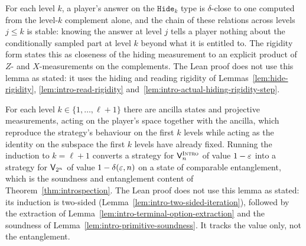 \effortHard

\begin{lemma}
\label{lem:intro-hiding-test}
For each level $k$, a player's answer on the $\mathtt{Hide}_k$ type is $\delta$-close to one
computed from the level-$k$ complement alone, and the chain of these relations across levels
$j \leq k$ is stable: knowing the answer at level $j$ tells a player nothing about the
conditionally sampled part at level $k$ beyond what it is entitled to. The rigidity form
states this as closeness of the hiding measurement to an explicit product of $Z$- and
$X$-measurements on the complements.
The Lean proof does not use this lemma as stated: it uses the hiding and reading rigidity of
Lemmas~\ref{lem:hide-rigidity}, \ref{lem:intro-read-rigidity}
and~\ref{lem:intro-actual-hiding-rigidity-step}.
\end{lemma}

\effortHard

\begin{lemma}
\label{lem:intro-induction}
For each level $k \in \{1, \ldots, \ell + 1\}$ there are ancilla states and projective
measurements, acting on the player's space together with the ancilla, which reproduce the
strategy's behaviour on the first $k$ levels while acting as the identity on the subspace the
first $k$ levels have already fixed. Running the induction to $k = \ell + 1$ converts a
strategy for $\mathsf{V}^{\textsc{Intro}}_n$ of value $1 - \varepsilon$ into a strategy for $\mathsf{V}_{2^n}$ of value
$1 - \delta(\varepsilon, n)$ on a state of comparable entanglement, which is the soundness and
entanglement content of Theorem~\ref{thm:introspection}.
The Lean proof does not use this lemma as stated: its induction is two-sided
(Lemma~\ref{lem:intro-two-sided-iteration}), followed by the extraction of
Lemma~\ref{lem:intro-terminal-option-extraction} and the soundness of
Lemma~\ref{lem:intro-primitive-soundness}. It tracks the value only, not the
entanglement.
\end{lemma}

